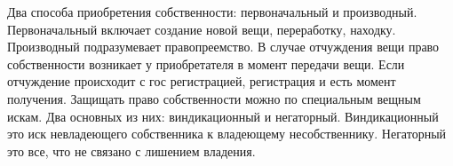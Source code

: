 \documentclass[a4paper, 12pt]{article}
\begin{document}
Два способа приобретения собственности: первоначальный и производный. Первоначальный включает создание новой вещи, переработку, находку. Производный подразумевает правопреемство. 
В случае отчуждения вещи право собственности возникает у приобретателя в момент передачи вещи. Если отчуждение происходит с гос регистрацией, регистрация и есть момент получения. 
Защищать право собственности можно по специальным вещным искам. Два основных из них: виндикационный и негаторный. 
Виндикационный это  иск невладеющего собственника к владеющему несобственнику. 
Негаторный это все, что не связано с лишением владения. 
\end{document}
